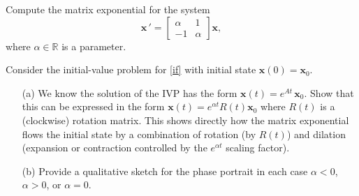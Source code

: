 \documentclass[11pt,letterpaper,boxed]{hmcpset}
\newcommand{\R}{\mathbb{R}}
\begin{document}
\begin{solution}
\vfill
\end{solution}
\newpage


\begin{problem}[7.] Compute the matrix exponential for the system
\begin{equation}
 \mathbf{x} \, ' = \begin{bmatrix} \alpha & 1 \\ -1 & \alpha \end{bmatrix} \mathbf{x},\label{if}
 \end{equation}
where $\alpha \in \R$ is a parameter.
\end{problem}

\begin{solution}
\vfill
\end{solution}
\newpage


\begin{problem}[8.] Consider the initial-value problem for \eqref{if} with initial state $\mathbf{x}(0)=\mathbf{x}_0$.
\begin{enumerate}
\item[(a)] We know the solution of the IVP has the form $\mathbf{x}(t) =e^{At} \, \mathbf{x}_0$. Show that this can be expressed in the form $\mathbf{x}(t) = e^{\alpha t} R(t) \mathbf{x}_0$ where $R(t)$ is a (clockwise) rotation matrix. This shows directly how the matrix exponential flows the initial state by a combination of rotation (by $R(t)$) and dilation (expansion or contraction controlled by the $e^{\alpha t}$ scaling factor). 
\item[(b)] Provide a qualitative sketch for the phase portrait in each case  $\alpha < 0$, $\alpha > 0$, or $\alpha = 0$.  
\end{enumerate}
\end{problem}

\begin{solution}
\vfill
\end{solution}
\end{document}
